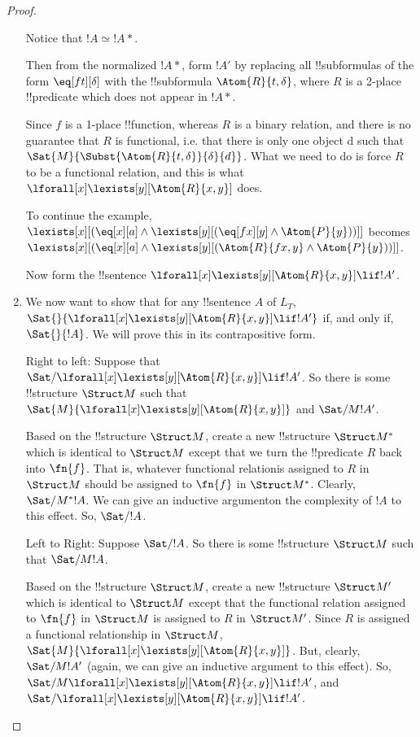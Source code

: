 \documentclass[../../include/open-logic-section]{subfiles}
\begin{document}
\begin{proof}
\begin{enumerate}
Notice that $ !A \simeq !A*$.

Then from the normalized $!A*$, form $!A'$ by replacing all
!!{subformula}s of the form $\eq[ft][\delta]$ with the 
!!{subformula} $\Atom{R}{t,\delta}$, where $R$
is a 2-place !!{predicate} which does not appear in $!A*$.

Since $f$ is a 1-place !!{function}, whereas $R$ is a binary relation, and
there is no guarantee that $R$ is functional, i.e. that there is only one
object d such that $\Sat{M}{\Subst{\Atom{R}{t,\delta}}{\delta}{d}}$.
 What we need to do is force $R$ to be a functional relation, and this 
is what $\lforall[x]\lexists[y][\Atom{R}{x,y}]$ does.

To continue the example, $\lexists[x][(\eq[x][a] \land
\lexists[y][(\eq[fx][y] \land \Atom{P}{y}))]]$ becomes
$\lexists[x][(\eq[x][a] \land \lexists[y][(\Atom{R}{fx,y} 
\land \Atom{P}{y}))]]$.

Now form the !!{sentence} $\lforall[x]\lexists[y][\Atom{R}{x,y}]\lif !A'$.


\item We now want to show that for any !!{sentence} $A$ of $L_T$,
$\Sat{}{\lforall[x]\lexists[y][\Atom{R}{x,y}]\lif !A'}$ if, and only if,
$\Sat{}{!A}$. We will prove this in its contrapositive form.

Right to left: Suppose that
$\Sat/{}{\lforall[x]\lexists[y][\Atom{R}{x,y}]\lif !A'}$. So there is some
!!{structure} $\Struct M$ such that
$\Sat{M}{\lforall[x]\lexists[y][\Atom{R}{x,y}]}$ and $\Sat/{M}{!A'}$.

Based on the !!{structure} $\Struct M$, create a new !!{structure}
$\Struct M^*$ which is identical to $\Struct M$ except that we turn the
!!{predicate} $R$ back into $\fn{f}$. That is, whatever functional
relationis
assigned to $R$ in $\Struct M$ should be assigned to $\fn{f}$ in
$\Struct M^*$. Clearly, $\Sat/{M^*}{!A}$. We can give an inductive
argumenton the complexity of $!A$ to this effect. So, $\Sat/{}{!A}$.

Left to Right: Suppose $\Sat/{}{!A}$. So there is some !!{structure}
$\Struct M$ such that $\Sat/{M}{!A}$.

Based on the !!{structure} $\Struct M$, create a new !!{structure}
$\Struct M'$ which is identical to $\Struct M$ except that the functional
relation assigned to $\fn{f}$ in $\Struct M$ is assigned to $R$ in
$\Struct M'$. Since $R$ is assigned a functional relationship in
$\Struct M$, $\Sat{M}{\lforall[x]\lexists[y][\Atom{R}{x,y}]}$. But,
clearly, $\Sat/{M}{!A'}$ (again, we can give an inductive argument to this
effect). So, $\Sat/{M}{\lforall[x]\lexists[y][\Atom{R}{x,y}]\lif !A'}$,
and$\Sat/{}{\lforall[x]\lexists[y][\Atom{R}{x,y}]\lif !A'}$.


\end{enumerate}
\end{proof}
\end{document}
